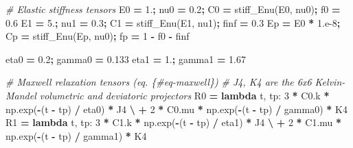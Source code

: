 \documentclass[
  a4paper,
  numbers=noendperiod,
  DIV=12]{scrreprt}
\newenvironment{Shaded}{\begin{snugshade}}{\end{snugshade}}
\newcommand{\CommentTok}[1]{\textcolor[rgb]{0.56,0.35,0.01}{\textit{#1}}}
\newcommand{\DecValTok}[1]{\textcolor[rgb]{0.00,0.00,0.81}{#1}}
\newcommand{\FloatTok}[1]{\textcolor[rgb]{0.00,0.00,0.81}{#1}}
\newcommand{\KeywordTok}[1]{\textcolor[rgb]{0.13,0.29,0.53}{\textbf{#1}}}
\newcommand{\NormalTok}[1]{#1}
\newcommand{\OperatorTok}[1]{\textcolor[rgb]{0.81,0.36,0.00}{\textbf{#1}}}
\begin{document}
\begin{Shaded}
\begin{Highlighting}[]
\CommentTok{\# Elastic stiffness tensors}
\NormalTok{E0 }\OperatorTok{=} \FloatTok{1.}\OperatorTok{;}\NormalTok{  nu0 }\OperatorTok{=} \FloatTok{0.2}\OperatorTok{;}\NormalTok{  C0 }\OperatorTok{=}\NormalTok{ stiff\_Enu(E0, nu0)}\OperatorTok{;}\NormalTok{  f0 }\OperatorTok{=} \FloatTok{0.6}
\NormalTok{E1 }\OperatorTok{=} \FloatTok{5.}\OperatorTok{;}\NormalTok{  nu1 }\OperatorTok{=} \FloatTok{0.3}\OperatorTok{;}\NormalTok{  C1 }\OperatorTok{=}\NormalTok{ stiff\_Enu(E1, nu1)}\OperatorTok{;}\NormalTok{  finf }\OperatorTok{=} \FloatTok{0.3}
\NormalTok{Ep }\OperatorTok{=}\NormalTok{ E0 }\OperatorTok{*} \FloatTok{1.e{-}8}\OperatorTok{;}\NormalTok{      Cp }\OperatorTok{=}\NormalTok{ stiff\_Enu(Ep, nu0)}\OperatorTok{;}\NormalTok{  fp }\OperatorTok{=} \DecValTok{1} \OperatorTok{{-}}\NormalTok{ f0 }\OperatorTok{{-}}\NormalTok{ finf}

\NormalTok{eta0 }\OperatorTok{=} \FloatTok{0.2}\OperatorTok{;}\NormalTok{   gamma0 }\OperatorTok{=} \FloatTok{0.133}
\NormalTok{eta1 }\OperatorTok{=} \FloatTok{1.}\OperatorTok{;}\NormalTok{    gamma1 }\OperatorTok{=} \FloatTok{1.67}

\CommentTok{\# Maxwell relaxation tensors (eq. \{\#eq{-}maxwell\})}
\CommentTok{\# J4, K4 are the 6x6 Kelvin{-}Mandel volumetric and deviatoric projectors}
\NormalTok{R0 }\OperatorTok{=} \KeywordTok{lambda}\NormalTok{ t, tp: }\DecValTok{3} \OperatorTok{*}\NormalTok{ C0.k }\OperatorTok{*}\NormalTok{ np.exp(}\OperatorTok{{-}}\NormalTok{(t }\OperatorTok{{-}}\NormalTok{ tp) }\OperatorTok{/}\NormalTok{ eta0)   }\OperatorTok{*}\NormalTok{ J4 }\OperatorTok{\textbackslash{}}
                 \OperatorTok{+} \DecValTok{2} \OperatorTok{*}\NormalTok{ C0.mu }\OperatorTok{*}\NormalTok{ np.exp(}\OperatorTok{{-}}\NormalTok{(t }\OperatorTok{{-}}\NormalTok{ tp) }\OperatorTok{/}\NormalTok{ gamma0) }\OperatorTok{*}\NormalTok{ K4}
\NormalTok{R1 }\OperatorTok{=} \KeywordTok{lambda}\NormalTok{ t, tp: }\DecValTok{3} \OperatorTok{*}\NormalTok{ C1.k }\OperatorTok{*}\NormalTok{ np.exp(}\OperatorTok{{-}}\NormalTok{(t }\OperatorTok{{-}}\NormalTok{ tp) }\OperatorTok{/}\NormalTok{ eta1)   }\OperatorTok{*}\NormalTok{ J4 }\OperatorTok{\textbackslash{}}
                 \OperatorTok{+} \DecValTok{2} \OperatorTok{*}\NormalTok{ C1.mu }\OperatorTok{*}\NormalTok{ np.exp(}\OperatorTok{{-}}\NormalTok{(t }\OperatorTok{{-}}\NormalTok{ tp) }\OperatorTok{/}\NormalTok{ gamma1) }\OperatorTok{*}\NormalTok{ K4}
\end{Highlighting}
\end{Shaded}
\end{document}
